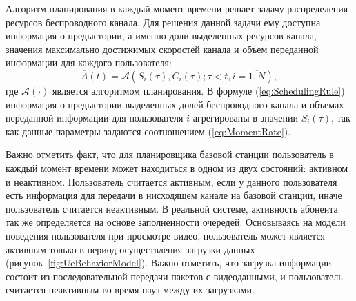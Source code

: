 Алгоритм планирования в каждый момент времени решает задачу распределения ресурсов беспроводного канала. Для решения данной задачи ему доступна информация о предыстории, а именно доли выделенных ресурсов канала, значения максимально достижимых скоростей канала и объем переданной информации для каждого пользователя:
\begin{equation}
\overline{A}(t) = \mathcal{A}\left( S_i(\tau), C_i(\tau);\tau<t, i=\overline{1,N} \right),
\label{eq:SchedulingRule}
\end{equation}
где $\mathcal{A}\left(\cdot\right)$ является алгоритмом планирования. В формуле (\ref{eq:SchedulingRule}) информация о предыстории выделенных долей беспроводного канала и объемах переданной информации для пользователя $i$ агрегированы в значении $S_i(\tau)$, так как данные параметры задаются соотношением (\ref{eq:MomentRate}).

Важно отметить факт, что для планировщика базовой станции пользователь в каждый момент времени может находиться в одном из двух состояний: активном и неактивном. Пользователь считается активным, если у данного пользователя есть информация для передачи в нисходящем канале на базовой станции, иначе пользователь считается неактивным. В реальной системе, активность абонента так же определяется на основе заполненности очередей. Основываясь на модели поведения пользователя при просмотре видео, пользователь может является активным только в период осуществления загрузки данных (рисунок~\ref{fig:UeBehaviorModel}). Важно отметить, что загрузка информации состоит из последовательной передачи пакетов с видеоданными, и пользователь считается неактивным во время пауз между их загрузками.

